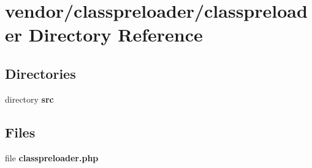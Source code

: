 \section{vendor/classpreloader/classpreloader Directory Reference}
\label{dir_b07ebe7be4034ec236cbda130cb0d1b6}
\subsection*{Directories}
\begin{DoxyCompactItemize}
\item 
directory {\bf src}
\end{DoxyCompactItemize}
\subsection*{Files}
\begin{DoxyCompactItemize}
\item 
file {\bf classpreloader.\+php}
\end{DoxyCompactItemize}
